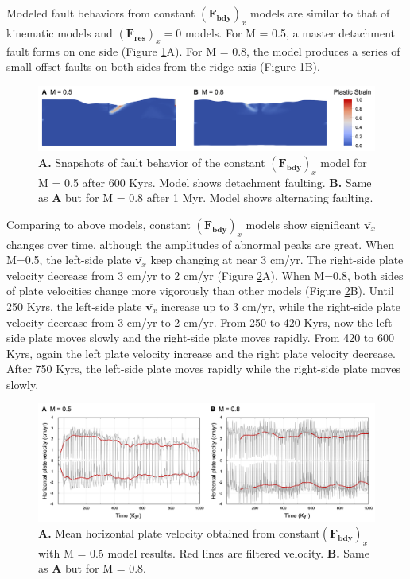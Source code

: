 \documentclass[letterpaper,12pt,notitle]{memphisthesis}                     %
\begin{document}
Modeled fault behaviors from constant $(\boldsymbol{F_{bdy}})_x$ models are similar to that of kinematic models and  $(\boldsymbol{F_{res}})_x = 0$ models. For M = 0.5, a master detachment fault forms on one side (Figure \ref{fig:fbfault}A). For M = 0.8, the model produces a series of small-offset faults on both sides from the ridge axis (Figure \ref{fig:fbfault}B).
%
\begin{figure}[!htb]
	\centering
	\includegraphics[width=0.99\linewidth]{./figs/fbfault.png}
	\caption{\textbf{A.} Snapshots of fault behavior of the constant $(\boldsymbol{F_{bdy}})_x$ model for M = 0.5 after 600 Kyrs. Model shows detachment faulting. \textbf{B.} Same as \textbf{A} but for M = 0.8 after 1 Myr. Model shows alternating faulting.}
	\label{fig:fbfault}
\end{figure}

Comparing to above models, constant $(\boldsymbol{F_{bdy}})_x$ models show significant $\overline{\boldsymbol{v}_x}$ changes over time, although the amplitudes of abnormal peaks are great. 
When M=0.5, the left-side plate $\overline{\boldsymbol{v}_x}$ keep changing at near 3 cm/yr. The right-side plate velocity decrease from 3 cm/yr to 2 cm/yr (Figure \ref{fig:fbmhv}A).
When M=0.8, both sides of plate velocities change more vigorously than other models (Figure \ref{fig:fbmhv}B). Until 250 Kyrs, the left-side plate $\overline{\boldsymbol{v}_x}$ increase up to 3 cm/yr, while the right-side plate velocity decrease from 3 cm/yr to 2 cm/yr. From 250 to 420 Kyrs, now the left-side plate moves slowly and the right-side plate moves rapidly. From 420 to 600 Kyrs, again the left plate velocity increase and the right plate velocity decrease. After 750 Kyrs, the left-side plate moves rapidly while the right-side plate moves slowly.
%
\begin{figure}[!htb]
	\centering
	\includegraphics[width=0.98\linewidth]{./figs/fbmhv.png}
	\caption{\textbf{A.} Mean horizontal plate velocity obtained from constant$(\boldsymbol{F_{bdy}})_x$ with M = 0.5 model results. Red lines are filtered velocity. \textbf{B.} Same as \textbf{A} but for M = 0.8. }
	\label{fig:fbmhv}
\end{figure}
\end{document}
